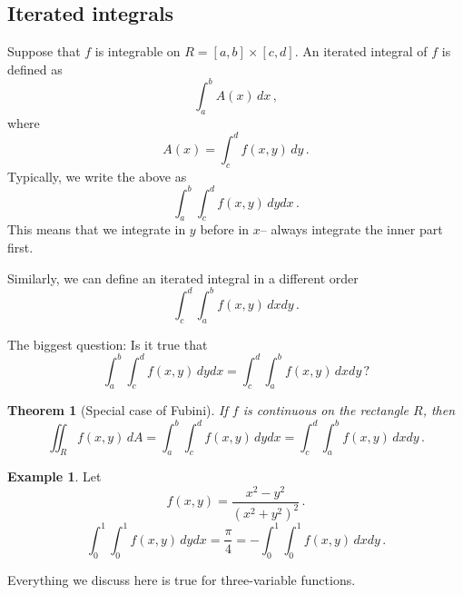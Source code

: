 \documentclass[
]{article}
\newtheorem{theorem}{Theorem}[section]
\theoremstyle{definition}
\theoremstyle{definition}
\newtheorem{example}{Example}[section]
\theoremstyle{definition}
\theoremstyle{definition}
\theoremstyle{remark}
\begin{document}
\subsection{Iterated integrals}\label{iterated-integrals}

Suppose that \(f\) is integrable on \(R= [a,b]\times [c,d]\).
An iterated integral of \(f\) is defined as
\begin{equation*}
    \int_a^b A(x) \, dx \,,
\end{equation*}
where
\begin{equation*}
    A(x) = \int_c^d f(x,y) \, dy \,.
\end{equation*}
Typically, we write the above as
\begin{equation*}
   \int_a^b \int_c^d f(x,y) \, dy dx \,. 
\end{equation*}
This means that we integrate in \(y\) before in \(x\)-- always integrate the inner part first.

Similarly, we can define an iterated integral in a different order
\begin{equation*}
    \int_c^d \int_a^b f(x,y) \, dx dy \,.
\end{equation*}

The biggest question:
Is it true that
\begin{equation*}
   \int_a^b \int_c^d f(x,y) \, dy dx  =
    \int_c^d \int_a^b f(x,y) \, dx dy \,?
\end{equation*}

\begin{theorem}[Special case of Fubini]
If \(f\) is continuous on the rectangle \(R\), then
\begin{equation*}
    \iint_R f(x,y) \, dA = \int_a^b \int_c^d f(x,y) \, dy dx = \int_c^d \int_a^b f(x,y) \, dx dy \,.
\end{equation*}
\end{theorem}

\begin{example}
Let
\begin{equation*}
    f(x,y) =  \frac{x^2 - y^2}{(x^2 + y^2)^2} \,.
\end{equation*}
\begin{equation*}
    \int_0^1\int_0^1 f(x,y) \,dy dx = \frac{\pi}{4} = - \int_0^1\int_0^1 f(x,y) \, dx dy \,.
\end{equation*}
\end{example}

Everything we discuss here is true for three-variable functions.
\end{document}
